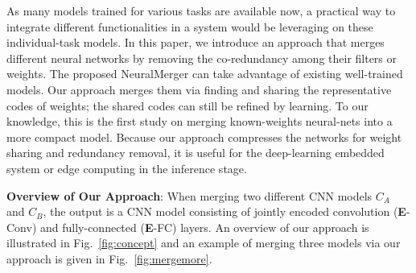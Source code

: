 \documentclass{article}
\begin{document}
	As many models trained for various tasks are available now, a practical way to integrate different functionalities in a system would be leveraging on these individual-task models.
	In this paper, we introduce an approach that merges different neural networks by removing the co-redundancy among their filters or weights.
	The proposed NeuralMerger can take advantage of existing well-trained models.
	Our approach merges them %
	via finding and sharing the representative codes of weights;
	the shared codes can still be refined by learning.
	To our knowledge, this is the first study on merging known-weights neural-nets into a more compact model. %
	Because our approach compresses the networks for weight sharing and redundancy removal, it is useful %
	for the deep-learning embedded system or edge computing in the inference stage.
	
	
	
	\vspace{0.15cm}
	\noindent \textbf{Overview of Our Approach}:
	When merging two different CNN models $C_A$ and $C_B$, the output is a CNN model consisting of jointly encoded convolution (\textbf{E}-Conv) and fully-connected (\textbf{E}-FC) layers.
	An overview of our approach is illustrated in Fig.~\ref{fig:concept} and an example of merging three models via our approach is given in Fig.~\ref{fig:mergemore}.
	
\end{document}
